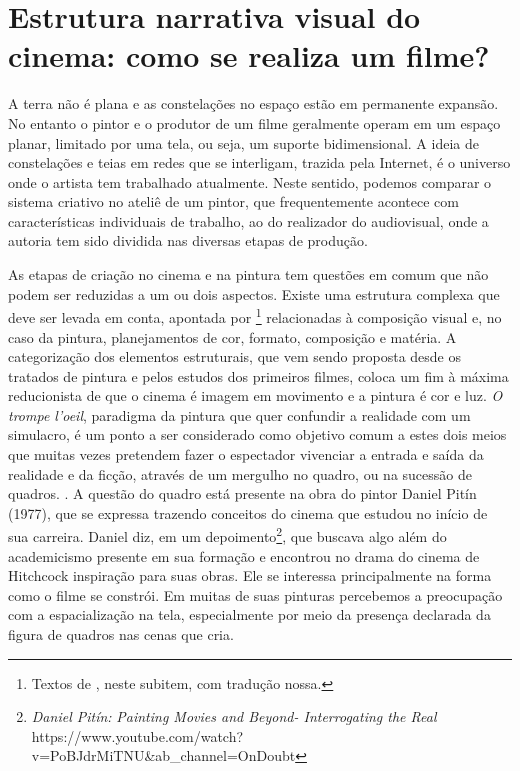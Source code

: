 \section{Estrutura narrativa visual do cinema: como se realiza um filme?}%
\label{sec:estrutura-narrativa-visual-do-cinema-como-se-realiza-um-filme}

A terra não é plana e as constelações no espaço estão em permanente
expansão. No entanto o pintor e o produtor de um filme geralmente
operam em um espaço planar, limitado por uma tela, ou seja, um suporte
bidimensional. A ideia de constelações e teias em redes que se
interligam, trazida pela Internet, é o universo onde o artista tem
trabalhado atualmente. Neste sentido, podemos comparar o sistema
criativo no ateliê de um pintor, que frequentemente acontece com
características individuais de trabalho, ao do realizador do
audiovisual, onde a autoria tem sido dividida nas diversas etapas de
produção.

As etapas de criação no cinema e na pintura tem questões em comum que
não podem ser reduzidas a um ou dois aspectos. Existe uma estrutura
complexa que deve ser levada em conta, apontada por \textcite{block2021visual}%
\footnote{Textos de \textcite{block2013visual,block2021visual}, neste subitem, com
	tradução nossa.} relacionadas à composição visual e, no caso da
pintura, planejamentos de cor, formato, composição e matéria. A
categorização dos elementos estruturais, que vem sendo proposta desde
os tratados de pintura e pelos estudos dos primeiros filmes, coloca um
fim à máxima reducionista de que o cinema é imagem em movimento e a
pintura é cor e luz. \emph{O trompe l'oeil}, paradigma da pintura que
quer confundir a realidade com um simulacro, é um ponto a ser
considerado como objetivo comum a estes dois meios que muitas vezes
pretendem fazer o espectador vivenciar a entrada e saída da realidade e
da ficção, através de um mergulho no quadro, ou na sucessão de quadros.
\parencite{sabino2000pintura}. A questão do quadro está presente na obra do pintor
Daniel Pitín (1977), que se expressa trazendo conceitos do cinema que
estudou no início de sua carreira. Daniel diz, em um
depoimento\footnote{\emph{Daniel Pitín:} \emph{Painting Movies and
		Beyond- Interrogating the Real}
	https://www.youtube.com/watch?v=PoBJdrMiTNU\&ab\_channel=OnDoubt}, que
buscava algo além do academicismo presente em sua formação e encontrou
no drama do cinema de Hitchcock inspiração para suas obras. Ele se
interessa principalmente na forma como o filme se constrói. Em muitas
de suas pinturas percebemos a preocupação com a espacialização na tela,
especialmente por meio da presença declarada da figura de quadros nas
cenas que cria.

